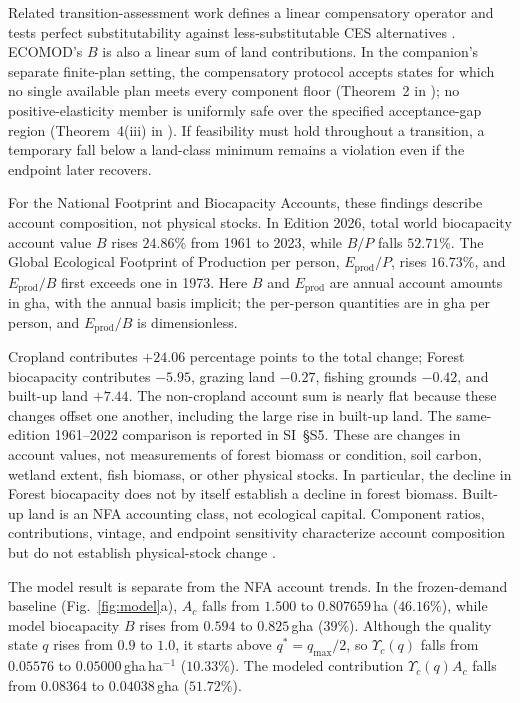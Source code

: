\documentclass[preprint,12pt,authoryear]{elsarticle}
\newcommand{\Ups}{\Upsilon_c}
\begin{document}
Related transition-assessment work defines a linear compensatory operator and tests perfect substitutability against less-substitutable CES alternatives \citep[Sections~2 and 4 of][]{Abaee2026a}. ECOMOD's $B$ is also a linear sum of land contributions. In the companion's separate finite-plan setting, the compensatory protocol accepts states for which no single available plan meets every component floor (Theorem~2 in \citet{Abaee2026a}); no positive-elasticity member is uniformly safe over the specified acceptance-gap region (Theorem~4(iii) in \citet{Abaee2026a}). If feasibility must hold throughout a transition, a temporary fall below a land-class minimum remains a violation even if the endpoint later recovers.

For the National Footprint and Biocapacity Accounts, these findings describe account composition, not physical stocks. In Edition 2026, total world biocapacity account value $B$ rises $24.86\%$ from 1961 to 2023, while $B/P$ falls $52.71\%$. The Global Ecological Footprint of Production per person, $E_{\mathrm{prod}}/P$, rises $16.73\%$, and $E_{\mathrm{prod}}/B$ first exceeds one in 1973. Here $B$ and $E_{\mathrm{prod}}$ are annual account amounts in gha, with the annual basis implicit; the per-person quantities are in gha per person, and $E_{\mathrm{prod}}/B$ is dimensionless.

Cropland contributes $+24.06$ percentage points to the total change; Forest biocapacity contributes $-5.95$, grazing land $-0.27$, fishing grounds $-0.42$, and built-up land $+7.44$. The non-cropland account sum is nearly flat because these changes offset one another, including the large rise in built-up land. The same-edition 1961--2022 comparison is reported in SI~\S S5. These are changes in account values, not measurements of forest biomass or condition, soil carbon, wetland extent, fish biomass, or other physical stocks. In particular, the decline in Forest biocapacity does not by itself establish a decline in forest biomass. Built-up land is an NFA accounting class, not ecological capital. Component ratios, contributions, vintage, and endpoint sensitivity characterize account composition but do not establish physical-stock change \citep{Lo2026NFA,Borucke2013,Blomqvist2013,GiampietroSaltelli2014,Galli2016,vdBerghGrazi2015}.

The model result is separate from the NFA account trends. In the frozen-demand baseline (Fig.~\ref{fig:model}a), $A_c$ falls from $1.500$ to $0.807659$\,ha ($46.16\%$), while model biocapacity $B$ rises from $0.594$ to $0.825$\,gha ($39\%$). Although the quality state $q$ rises from $0.9$ to $1.0$, it starts above $q^*=q_{\max}/2$, so $\Ups(q)$ falls from $0.05576$ to $0.05000$\,gha\,ha$^{-1}$ ($10.33\%$). The modeled contribution $\Ups(q)A_c$ falls from $0.08364$ to $0.04038$\,gha ($51.72\%$).
\end{document}
